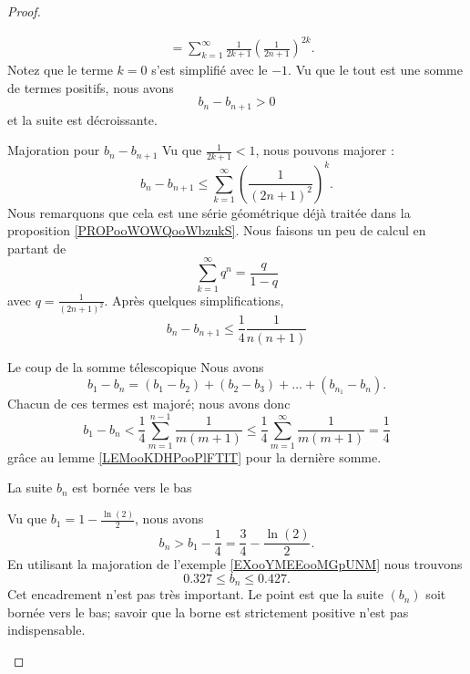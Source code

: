 \begin{proof}
\begin{subproof}
\begin{subequations}
\begin{align}
				            & =\sum_{k=1}^{\infty}  \frac{1}{ 2k+1 }  \left( \frac{1}{ 2n+1 } \right)^{2k}.
			\end{align}
		\end{subequations}
		Notez que le terme \( k=0\) s'est simplifié avec le \( -1\). Vu que le tout est une somme de termes positifs, nous avons
		\begin{equation}
			b_n-b_{n+1}>0
		\end{equation}
		et la suite est décroissante.
		\item[Majoration pour \( b_n-b_{n+1}\)]
		Vu que \( \frac{1}{ 2k+1 }<1\), nous pouvons majorer :
		\begin{equation}
			b_n-b_{n+1}\leq \sum_{k=1}^{\infty}\left( \frac{1}{ (2n+1)^2 } \right)^k.
		\end{equation}
		Nous remarquons que cela est une série géométrique déjà traitée dans la proposition \ref{PROPooWOWQooWbzukS}. Nous faisons un peu de calcul en partant de
		\begin{equation}
			\sum_{k=1}^{\infty}q^n=\frac{ q }{ 1-q }
		\end{equation}
		avec \( q=\frac{1}{ (2n+1)^2 }\). Après quelques simplifications,
		\begin{equation}
			b_n-b_{n+1}\leq \frac{1}{ 4 }\frac{ 1 }{ n(n+1) }
		\end{equation}
		\item[Le coup de la somme télescopique]
		Nous avons
		\begin{equation}
			b_1-b_n=(b_1-b_2)+(b_2-b_3)+\ldots+(b_{n_1}-b_n).
		\end{equation}
		Chacun de ces termes est majoré; nous avons donc
		\begin{equation}
			b_1-b_n<\frac{1}{ 4 }\sum_{m=1}^{n-1}\frac{1}{ m(m+1) }\leq \frac{1}{ 4 }\sum_{m=1}^{\infty}\frac{1}{ m(m+1) }=\frac{1}{ 4 }
		\end{equation}
		grâce au lemme \ref{LEMooKDHPooPlFTIT} pour la dernière somme.
		\item[La suite \( b_n\) est bornée vers le bas]

		Vu que \( b_1=1-\frac{ \ln(2) }{2}\), nous avons
		\begin{equation}
			b_n>b_1-\frac{1}{ 4 }=\frac{ 3 }{ 4 }-\frac{ \ln(2) }{ 2 }.
		\end{equation}
		En utilisant la majoration de l'exemple \ref{EXooYMEEooMGpUNM} nous trouvons
		\begin{equation}
			0.327\leq b_n\leq 0.427.
		\end{equation}
		Cet encadrement n'est pas très important. Le point est que la suite \( (b_n)\) soit bornée vers le bas; savoir que la borne est strictement positive n'est pas indispensable.


\end{subproof}
\end{proof}

